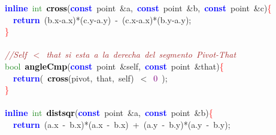 \mbox{}\textbf{\textcolor{Blue}{inline}}\ \textcolor{ForestGreen}{int}\ \textbf{\textcolor{Black}{cross}}\textcolor{BrickRed}{(}\textbf{\textcolor{Blue}{const}}\ point\ \textcolor{BrickRed}{\&}a\textcolor{BrickRed}{,}\ \textbf{\textcolor{Blue}{const}}\ point\ \textcolor{BrickRed}{\&}b\textcolor{BrickRed}{,}\ \textbf{\textcolor{Blue}{const}}\ point\ \textcolor{BrickRed}{\&}c\textcolor{BrickRed}{)}\textcolor{Red}{\{} \\
\mbox{}\ \ \textbf{\textcolor{Blue}{return}}\ \textcolor{BrickRed}{(}b\textcolor{BrickRed}{.}x\textcolor{BrickRed}{-}a\textcolor{BrickRed}{.}x\textcolor{BrickRed}{)*(}c\textcolor{BrickRed}{.}y\textcolor{BrickRed}{-}a\textcolor{BrickRed}{.}y\textcolor{BrickRed}{)}\ \textcolor{BrickRed}{-}\ \textcolor{BrickRed}{(}c\textcolor{BrickRed}{.}x\textcolor{BrickRed}{-}a\textcolor{BrickRed}{.}x\textcolor{BrickRed}{)*(}b\textcolor{BrickRed}{.}y\textcolor{BrickRed}{-}a\textcolor{BrickRed}{.}y\textcolor{BrickRed}{);} \\
\mbox{}\textcolor{Red}{\}} \\
\mbox{} \\
\mbox{}\textit{\textcolor{Brown}{//Self\ $<$\ that\ si\ esta\ a\ la\ derecha\ del\ segmento\ Pivot-That}} \\
\mbox{}\textcolor{ForestGreen}{bool}\ \textbf{\textcolor{Black}{angleCmp}}\textcolor{BrickRed}{(}\textbf{\textcolor{Blue}{const}}\ point\ \textcolor{BrickRed}{\&}self\textcolor{BrickRed}{,}\ \textbf{\textcolor{Blue}{const}}\ point\ \textcolor{BrickRed}{\&}that\textcolor{BrickRed}{)}\textcolor{Red}{\{} \\
\mbox{}\ \ \textbf{\textcolor{Blue}{return}}\textcolor{BrickRed}{(}\ \textbf{\textcolor{Black}{cross}}\textcolor{BrickRed}{(}pivot\textcolor{BrickRed}{,}\ that\textcolor{BrickRed}{,}\ self\textcolor{BrickRed}{)}\ \textcolor{BrickRed}{$<$}\ \textcolor{Purple}{0}\ \textcolor{BrickRed}{);} \\
\mbox{}\textcolor{Red}{\}} \\
\mbox{} \\
\mbox{}\textbf{\textcolor{Blue}{inline}}\ \textcolor{ForestGreen}{int}\ \textbf{\textcolor{Black}{distsqr}}\textcolor{BrickRed}{(}\textbf{\textcolor{Blue}{const}}\ point\ \textcolor{BrickRed}{\&}a\textcolor{BrickRed}{,}\ \textbf{\textcolor{Blue}{const}}\ point\ \textcolor{BrickRed}{\&}b\textcolor{BrickRed}{)}\textcolor{Red}{\{} \\
\mbox{}\ \ \textbf{\textcolor{Blue}{return}}\ \textcolor{BrickRed}{(}a\textcolor{BrickRed}{.}x\ \textcolor{BrickRed}{-}\ b\textcolor{BrickRed}{.}x\textcolor{BrickRed}{)*(}a\textcolor{BrickRed}{.}x\ \textcolor{BrickRed}{-}\ b\textcolor{BrickRed}{.}x\textcolor{BrickRed}{)}\ \textcolor{BrickRed}{+}\ \textcolor{BrickRed}{(}a\textcolor{BrickRed}{.}y\ \textcolor{BrickRed}{-}\ b\textcolor{BrickRed}{.}y\textcolor{BrickRed}{)*(}a\textcolor{BrickRed}{.}y\ \textcolor{BrickRed}{-}\ b\textcolor{BrickRed}{.}y\textcolor{BrickRed}{);} \\

